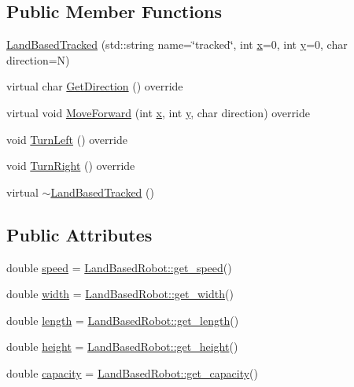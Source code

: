 \subsection*{Public Member Functions}
\begin{DoxyCompactItemize}
\item 
\hyperlink{classfp_1_1_land_based_tracked_adde9b81138a39b13b4b05386c1a6b3a3}{Land\+Based\+Tracked} (std\+::string name=\char`\"{}tracked\char`\"{}, int \hyperlink{classfp_1_1_land_based_robot_a305bb45b4478ab51080fa0d7fc7bc2d7}{x}=0, int \hyperlink{classfp_1_1_land_based_robot_ad1ff889538680eba6bc6eb135b4ccd63}{y}=0, char direction=\textquotesingle{}N\textquotesingle{})
\item 
virtual char \hyperlink{classfp_1_1_land_based_tracked_a3e6ba37a5c5bf8f2b4abb19907e5e9b8}{Get\+Direction} () override
\item 
virtual void \hyperlink{classfp_1_1_land_based_tracked_a3f4290b614fe0e31e361366e71501cea}{Move\+Forward} (int \hyperlink{classfp_1_1_land_based_robot_a305bb45b4478ab51080fa0d7fc7bc2d7}{x}, int \hyperlink{classfp_1_1_land_based_robot_ad1ff889538680eba6bc6eb135b4ccd63}{y}, char direction) override
\item 
void \hyperlink{classfp_1_1_land_based_tracked_a63141c32f8f81c301be4126297103a41}{Turn\+Left} () override
\item 
void \hyperlink{classfp_1_1_land_based_tracked_a813613a1eaa7a0782ea254a167d97da3}{Turn\+Right} () override
\item 
virtual \hyperlink{classfp_1_1_land_based_tracked_a60b4e1da43f053a5a0351d52d79785e0}{$\sim$\+Land\+Based\+Tracked} ()
\end{DoxyCompactItemize}
\subsection*{Public Attributes}
\begin{DoxyCompactItemize}
\item 
double \hyperlink{classfp_1_1_land_based_tracked_a08b67f2f7c1da6db1c4d6cf4de689573}{speed} = \hyperlink{classfp_1_1_land_based_robot_a44fed3a00505f6679ff8505aebae4505}{Land\+Based\+Robot\+::get\+\_\+speed}()
\item 
double \hyperlink{classfp_1_1_land_based_tracked_a82b74ecf56d8d84b001fcb4f1ae92dad}{width} = \hyperlink{classfp_1_1_land_based_robot_a523b439167030a7ab1e0e7f6c8d42315}{Land\+Based\+Robot\+::get\+\_\+width}()
\item 
double \hyperlink{classfp_1_1_land_based_tracked_a5c81a68468defb336f0c207069290cc2}{length} = \hyperlink{classfp_1_1_land_based_robot_adb03fbded9a3b0553301bcc0322cb1c1}{Land\+Based\+Robot\+::get\+\_\+length}()
\item 
double \hyperlink{classfp_1_1_land_based_tracked_a23bbcb88d1b14513c786017dc1ceee66}{height} = \hyperlink{classfp_1_1_land_based_robot_ac77253c989c417ee26654541c50669d4}{Land\+Based\+Robot\+::get\+\_\+height}()
\item 
double \hyperlink{classfp_1_1_land_based_tracked_a13d92f0fa31949ca268678a7c339d4f7}{capacity} = \hyperlink{classfp_1_1_land_based_robot_a24c0f6d395f3dfd6bdbcf5a2a9801de1}{Land\+Based\+Robot\+::get\+\_\+capacity}()
\end{DoxyCompactItemize}
